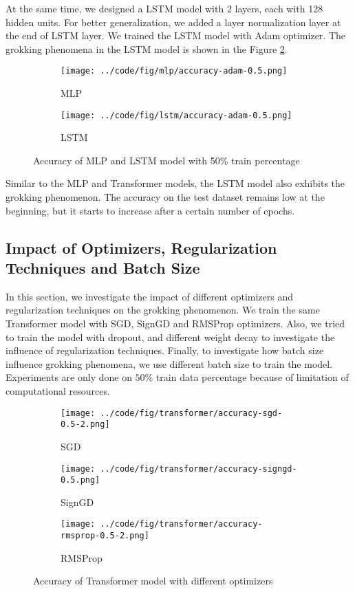 \documentclass{article}
\begin{document}
At the same time, we designed a LSTM model with 2 layers, each with 128 hidden units. For better generalization, we added a layer normalization layer at the end of LSTM layer. We trained the LSTM model with Adam optimizer. The grokking phenomena in the LSTM model is shown in the Figure \ref{fig:lstm-accuracy}.

\begin{figure}[ht]
    \centering
    \begin{subfigure}{0.45\textwidth}
        \texttt{[image: ../code/fig/mlp/accuracy-adam-0.5.png]}
        \caption{MLP}
        \label{fig:mlp-accuracy}
    \end{subfigure}
    \begin{subfigure}{0.45\textwidth}
        \texttt{[image: ../code/fig/lstm/accuracy-adam-0.5.png]}
        \caption{LSTM}
        \label{fig:lstm-accuracy}
    \end{subfigure}
    \caption{Accuracy of MLP and LSTM model with 50\% train percentage}
    \label{fig:mlp-lstm-accuracy}
\end{figure}
Similar to the MLP and Transformer models, the LSTM model also exhibits the grokking phenomenon. The accuracy on the test dataset remains low at the beginning, but it starts to increase after a certain number of epochs.

\subsection{Impact of Optimizers, Regularization Techniques and Batch Size}

In this section, we investigate the impact of different optimizers and regularization techniques on the grokking phenomenon. We train the same Transformer model with SGD, SignGD and RMSProp optimizers. Also, we tried to train the model with dropout, and different weight decay to investigate the influence of regularization techniques. Finally, to investigate how batch size influence grokking phenomena, we use different batch size to train the model. Experiments are only done on $50\%$ train data percentage because of limitation of computational resources.

\begin{figure}[ht]
    \centering
    \begin{subfigure}{0.3\textwidth}
        \texttt{[image: ../code/fig/transformer/accuracy-sgd-0.5-2.png]}
        \caption{SGD}
    \end{subfigure}
    \begin{subfigure}{0.3\textwidth}
        \texttt{[image: ../code/fig/transformer/accuracy-signgd-0.5.png]}
        \caption{SignGD}
    \end{subfigure}
    \begin{subfigure}{0.3\textwidth}
        \texttt{[image: ../code/fig/transformer/accuracy-rmsprop-0.5-2.png]}
        \caption{RMSProp}
    \end{subfigure}
    \caption{Accuracy of Transformer model with different optimizers}
    \label{fig:transformer-optimizer}
\end{figure}
\end{document}
